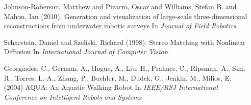 \documentclass{llncs}
\begin{document}
\begin{thebibliography}{9}
Johnson-Roberson, Matthew and Pizarro, Oscar and Williams, Stefan B. and Mahon, Ian (2010).
\newblock Generation and visualization of large-scale three-dimensional reconstructions from underwater robotic surveys
\newblock In {\em Journal of Field Robotics}.

Scharstein, Daniel and Szeliski, Richard (1998).
\newblock Stereo Matching with Nonlinear Diffusion
\newblock In {\em International Journal of Computer Vision}.

Georgiades, C., German, A., Hogue, A., Liu, H., Prahacs, C., Ripsman, A., Sim, R., Torres, L.-A., Zhang, P., Buehler, M., Dudek, G., Jenkin, M., Milios, E. (2004)
\newblock AQUA: An Aquatic Walking Robot 
\newblock In {\em IEEE/RSJ International Conference on Intelligent Robots and Systems}
\end{thebibliography}
\end{document}
